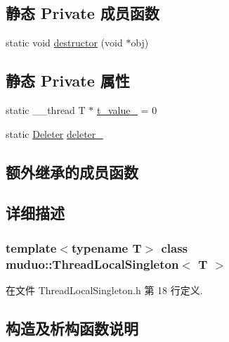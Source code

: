 \subsection*{静态 Private 成员函数}
\begin{DoxyCompactItemize}
\item 
static void \hyperlink{classmuduo_1_1ThreadLocalSingleton_a5506686777ddc14d0643f2358ed9f44e}{destructor} (void $\ast$obj)
\end{DoxyCompactItemize}
\subsection*{静态 Private 属性}
\begin{DoxyCompactItemize}
\item 
static \+\_\+\+\_\+thread T $\ast$ \hyperlink{classmuduo_1_1ThreadLocalSingleton_ab5242a7394714fe0451f640456006dce}{t\+\_\+value\+\_\+} = 0
\item 
static \hyperlink{classmuduo_1_1ThreadLocalSingleton_1_1Deleter}{Deleter} \hyperlink{classmuduo_1_1ThreadLocalSingleton_a25e20990a9a304c1e8634d4ae1604dd0}{deleter\+\_\+}
\end{DoxyCompactItemize}
\subsection*{额外继承的成员函数}


\subsection{详细描述}
\subsubsection*{template$<$typename T$>$\newline
class muduo\+::\+Thread\+Local\+Singleton$<$ T $>$}



在文件 Thread\+Local\+Singleton.\+h 第 18 行定义.



\subsection{构造及析构函数说明}
\mbox{\label{classmuduo_1_1ThreadLocalSingleton_a8090f00ced92dc29461f36b2c0815851}} 
